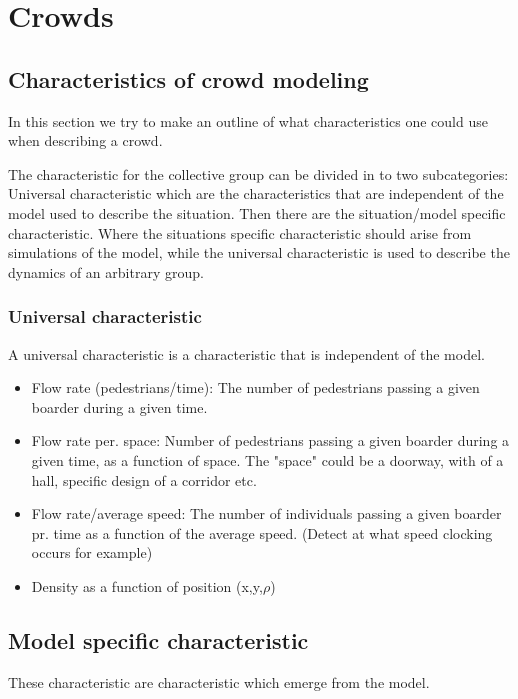 \section{Crowds}
\label{sec:crowds}

\subsection{Characteristics of crowd modeling}
In this section we try to make an outline of what characteristics one could use when
describing a crowd.

The characteristic for the collective group can be divided in to two 
subcategories: Universal characteristic which are the characteristics that are 
independent of the model used to describe the situation. Then there are the 
situation/model specific characteristic.  Where the situations specific 
characteristic should arise from simulations of the model, while the universal 
characteristic is used to describe the dynamics of an arbitrary group. 

\subsubsection{Universal characteristic}
A universal characteristic is a characteristic that is independent of the model.

\begin{itemize}
    \item Flow rate (pedestrians/time): The number of pedestrians passing a 
        given boarder during a given time.

    \item Flow rate per. space: Number of pedestrians passing a given boarder 
        during a given time, as a function of space. The "space" could be a 
        doorway, with of a hall, specific design of a corridor etc.

    \item Flow rate/average speed: The number of individuals passing a given 
        boarder pr.  time as a function of the average speed. (Detect at what 
        speed clocking occurs for example)

    \item Density as a function of position (x,y,$\rho$)
\end{itemize}

\subsection{Model specific characteristic}
These characteristic are characteristic which emerge from the model.

